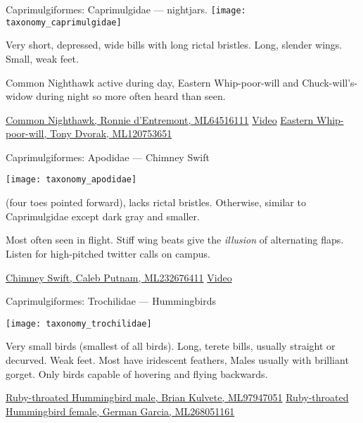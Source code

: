 \documentclass[t]{beamer}
\begin{document}
\begin{frame}[t]{Caprimulgiformes: Caprimulgidae — nightjars.}
\texttt{[image: taxonomy\_caprimulgidae]}

\hangpara Very short, depressed, wide bills with long rictal bristles. Long, slender wings. Small, weak feet.

\hangpara Common Nighthawk active during day, Eastern Whip-poor-will and Chuck-will's-widow during night so more often heard than seen.

\vfilll

\tiny \href{https://macaulaylibrary.org/asset/64516111}{Common Nighthawk, Ronnie d'Entremont, ML64516111} \hfill \href{https://www.allaboutbirds.org/guide/Common_Nighthawk/photo-gallery/466538}{Video} \hfill \href{https://macaulaylibrary.org/asset/120753651}{Eastern Whip-poor-will, Tony Dvorak, ML120753651}
\end{frame}

\begin{frame}[t]{Caprimulgiformes: Apodidae — Chimney Swift}

\vspace{-\baselineskip}

\begin{multicols}{2}
\texttt{[image: taxonomy\_apodidae]}

\columnbreak

 (four toes pointed forward), lacks rictal bristles. Otherwise, similar to Caprimulgidae except dark gray and smaller. 

\vspace{\baselineskip}

Most often seen in flight. Stiff wing beats give the \textit{illusion} of alternating flaps. Listen for high-pitched twitter calls on campus.
\end{multicols}

\vfilll

\tiny \href{https://macaulaylibrary.org/asset/232676411}{Chimney Swift, Caleb Putnam, ML232676411} \qquad  \href{https://www.allaboutbirds.org/guide/Chimney_Swift/photo-gallery/440546}{Video}

\end{frame}

\begin{frame}[t]{Caprimulgiformes: Trochilidae — Hummingbirds}
\vspace{-0.5\baselineskip}


\texttt{[image: taxonomy\_trochilidae]}

\hangpara Very small birds (smallest of all birds). Long, terete bills, usually straight or decurved. Weak feet. Most have iridescent feathers, Males usually with brilliant gorget. Only birds capable of hovering and flying backwards.

\vfilll

\tiny \href{https://macaulaylibrary.org/asset/97947051}{Ruby-throated Hummingbird male, Brian Kulvete, ML97947051} \hfill  \href{https://macaulaylibrary.org/asset/268051161}{Ruby-throated Hummingbird female, German Garcia, ML268051161}

\end{frame}
\end{document}
